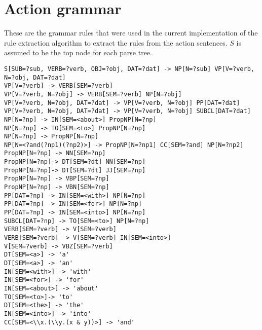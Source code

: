 

\section{Action grammar}

These are the grammar rules that were used in the current implementation of the
rule extraction algorithm to extract the rules from the action sentences. $S$ is
assumed to be the top node for each parse tree.

\begin{verbatim}
S[SUB=?sub, VERB=?verb, OBJ=?obj, DAT=?dat] -> NP[N=?sub] VP[V=?verb, N=?obj, DAT=?dat]
VP[V=?verb] -> VERB[SEM=?verb]
VP[V=?verb, N=?obj] -> VERB[SEM=?verb] NP[N=?obj] 
VP[V=?verb, N=?obj, DAT=?dat] -> VP[V=?verb, N=?obj] PP[DAT=?dat]
VP[V=?verb, N=?obj, DAT=?dat] -> VP[V=?verb, N=?obj] SUBCL[DAT=?dat]
NP[N=?np] -> IN[SEM=<about>] PropNP[N=?np]
NP[N=?np] -> TO[SEM=<to>] PropNP[N=?np]
NP[N=?np] -> PropNP[N=?np]
NP[N=<?and(?np1)(?np2)>] -> PropNP[N=?np1] CC[SEM=?and] NP[N=?np2]
PropNP[N=?np] -> NN[SEM=?np]
PropNP[N=?np]-> DT[SEM=?dt] NN[SEM=?np]
PropNP[N=?np]-> DT[SEM=?dt] JJ[SEM=?np]
PropNP[N=?np] -> VBP[SEM=?np]
PropNP[N=?np] -> VBN[SEM=?np]
PP[DAT=?np] -> IN[SEM=<with>] NP[N=?np]
PP[DAT=?np] -> IN[SEM=<for>] NP[N=?np]
PP[DAT=?np] -> IN[SEM=<into>] NP[N=?np]
SUBCL[DAT=?np] -> TO[SEM=<to>] NP[N=?np]
VERB[SEM=?verb] -> V[SEM=?verb]
VERB[SEM=?verb] -> V[SEM=?verb] IN[SEM=<into>]
V[SEM=?verb] -> VBZ[SEM=?verb]
DT[SEM=<a>] -> 'a'
DT[SEM=<a>] -> 'an'
IN[SEM=<with>] -> 'with'
IN[SEM=<for>] -> 'for'
IN[SEM=<about>] -> 'about'
TO[SEM=<to>]-> 'to'
DT[SEM=<the>] -> 'the'
IN[SEM=<into>] -> 'into'
CC[SEM=<\\x.(\\y.(x & y))>] -> 'and'
\end{verbatim}
